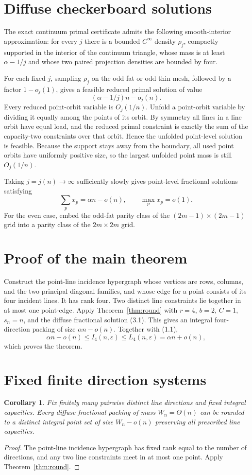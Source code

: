 \documentclass[11pt]{article}
\newtheorem{corollary}[theorem]{Corollary}
\begin{document}
\section{Diffuse checkerboard solutions}
The exact continuum primal certificate admits the following smooth-interior approximation: for every $j$ there is a bounded $C^\infty$ density $\rho_j$, compactly supported in the interior of the continuum triangle, whose mass is at least $\alpha-1/j$ and whose two paired projection densities are bounded by four.

For each fixed $j$, sampling $\rho_j$ on the odd-fat or odd-thin mesh, followed by a factor $1-o_j(1)$, gives a feasible reduced primal solution of value
\[
(\alpha-1/j)n-o_j(n).
\]
Every reduced point-orbit variable is $O_j(1/n)$. Unfold a point-orbit variable by dividing it equally among the points of its orbit. By symmetry all lines in a line orbit have equal load, and the reduced primal constraint is exactly the sum of the capacity-two constraints over that orbit. Hence the unfolded point-level solution is feasible. Because the support stays away from the boundary, all used point orbits have uniformly positive size, so the largest unfolded point mass is still $O_j(1/n)$.

Taking $j=j(n)\to\infty$ sufficiently slowly gives point-level fractional solutions satisfying
\[
\sum_p x_p=\alpha n-o(n),
\qquad
\max_p x_p=o(1).
\tag{3.1}
\]
For the even case, embed the odd-fat parity class of the $(2m-1)\times(2m-1)$ grid into a parity class of the $2m\times2m$ grid.

\section{Proof of the main theorem}
Construct the point-line incidence hypergraph whose vertices are rows, columns, and the two principal diagonal families, and whose edge for a point consists of its four incident lines. It has rank four. Two distinct line constraints lie together in at most one point-edge. Apply Theorem~\ref{thm:round} with $r=4$, $b=2$, $C=1$, $s_n=n$, and the diffuse fractional solution (3.1). This gives an integral four-direction packing of size $\alpha n-o(n)$. Together with (1.1),
\[
\alpha n-o(n)\le I_4(n,\varepsilon)\le L_4(n,\varepsilon)=\alpha n+o(n),
\]
which proves the theorem.

\section{Fixed finite direction systems}
\begin{corollary}
Fix finitely many pairwise distinct line directions and fixed integral capacities. Every diffuse fractional packing of mass $W_n=\Theta(n)$ can be rounded to a distinct integral point set of size $W_n-o(n)$ preserving all prescribed line capacities.
\end{corollary}
\begin{proof}
The point-line incidence hypergraph has fixed rank equal to the number of directions, and any two line constraints meet in at most one point. Apply Theorem~\ref{thm:round}.\qedhere
\end{proof}
\end{document}
